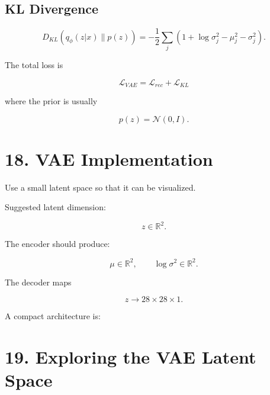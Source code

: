 \documentclass[10pt]{article}
\begin{document}
\subsection*{KL Divergence}

\[
D_{KL}
\left(
q_{\phi}(z|x)\parallel p(z)
\right)
=
-\frac{1}{2}
\sum_j
\left(
1+\log\sigma_j^2-\mu_j^2-\sigma_j^2
\right).
\]

The total loss is

\[
\boxed{
\mathcal{L}_{VAE}
=
\mathcal{L}_{rec}
+
\mathcal{L}_{KL}
}
\]

where the prior is usually

\[
p(z)=\mathcal{N}(0,I).
\]

\section*{18. VAE Implementation}

Use a small latent space so that it can be visualized.

Suggested latent dimension:

\[
z\in\mathbb{R}^{2}.
\]

The encoder should produce:

\[
\mu\in\mathbb{R}^{2},
\qquad
\log\sigma^2\in\mathbb{R}^{2}.
\]

The decoder maps

\[
z\rightarrow28\times28\times1.
\]

A compact architecture is:

\begin{center}
\end{center}

\section*{19. Exploring the VAE Latent Space}
\end{document}

